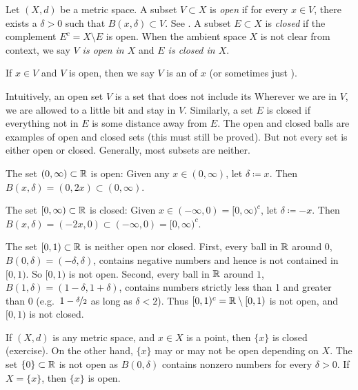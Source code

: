 \begin{defn}
Let $(X,d)$ be a metric space.  A subset $V \subset X$
is \emph{open}
if for every $x \in V$, there exists a $\delta > 0$ such that
$B(x,\delta) \subset V$.  See .  A subset $E \subset X$ is 
\emph{closed} if the complement $E^c = X \setminus E$ is open.
When the ambient space $X$ is not clear from context,
we say \emph{$V$ is open in $X$} and \emph{$E$ is closed in $X$}.

If $x \in V$ and $V$ is open, then we say 
$V$ is an \emph{} of $x$ (or
sometimes just \emph{}).
\end{defn}

\begin{myfigureht}
\caption{Open set in a metric space.  Note that $\delta$ depends on $x$.\label{fig:msopenset}}
\end{myfigureht}

Intuitively, an open set $V$ is a set that does not include its
Wherever we are in $V$,
we are allowed to  a little bit and
stay in $V$.  Similarly, a set $E$ is closed if everything not in $E$
is some distance away from $E$.
The open and closed balls are examples of open and closed sets
(this must still be proved).
But not every set is either open or closed.  Generally, most subsets are neither.

\begin{example}
The set $(0,\infty) \subset {\mathbb{R}}$ is open:  Given any $x \in (0,\infty)$,
let $\delta \coloneqq x$.  Then $B(x,\delta) = (0,2x) \subset (0,\infty)$.

The set $[0,\infty) \subset {\mathbb{R}}$ is closed:  Given $x \in (-\infty,0) =
[0,\infty)^c$,
let $\delta \coloneqq -x$.  Then $B(x,\delta) = (-2x,0) \subset
(-\infty,0) = [0,\infty)^c$.

The set $[0,1) \subset {\mathbb{R}}$ is neither open nor closed.  First,
every ball in ${\mathbb{R}}$ around $0$, $B(0,\delta) = (-\delta,\delta)$, contains negative
numbers and hence is not contained in $[0,1)$.  So $[0,1)$ is not open.
Second, every ball in ${\mathbb{R}}$ around $1$,
$B(1,\delta) = (1-\delta,1+\delta)$, contains
numbers strictly less than 1 and greater than 0
(e.g.\ $1-\nicefrac{\delta}{2}$ as long as $\delta < 2$).
Thus $[0,1)^c = {\mathbb{R}} \setminus
[0,1)$ is not open, and $[0,1)$ is not closed.

If $(X,d)$ is any metric space, and $x \in X$ is a point, then $\{ x \}$ is
closed (exercise).
On the other hand, $\{ x \}$ may or may not be open depending on $X$.
The set $\{ 0 \} \subset {\mathbb{R}}$ is not open as $B(0,\delta)$
contains nonzero numbers for every $\delta > 0$.
If $X=\{ x \}$, then $\{ x \}$ is open.
\end{example}

